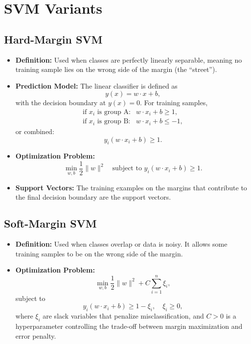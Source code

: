 \documentclass[10pt]{article}
\begin{document}
\section{SVM Variants}

\subsection{Hard-Margin SVM}
\begin{itemize}
    \item \textbf{Definition:} Used when classes are perfectly linearly separable, meaning no training sample lies on the wrong side of the margin (the “street”).
    \item \textbf{Prediction Model:} The linear classifier is defined as
    \[
    y(x) = w \cdot x + b,
    \]
    with the decision boundary at \(y(x)=0\). For training samples,
    \[
    \begin{array}{ll}
    \text{if } x_i \text{ is group A:} & w \cdot x_i + b \geq 1, \\
    \text{if } x_i \text{ is group B:} & w \cdot x_i + b \leq -1,
    \end{array}
    \]
    or combined:
    \[
    y_i (w \cdot x_i + b) \geq 1.
    \]
    \item \textbf{Optimization Problem:}
    \[
    \min_{w,b} \frac{1}{2}\|w\|^2 \quad \text{subject to } y_i (w \cdot x_i + b) \geq 1.
    \]
    \item \textbf{Support Vectors:} The training examples on the margins that contribute to the final decision boundary are the support vectors.
\end{itemize}

\subsection{Soft-Margin SVM}
\begin{itemize}
    \item \textbf{Definition:} Used when classes overlap or data is noisy. It allows some training samples to be on the wrong side of the margin.
    \item \textbf{Optimization Problem:}
    \[
    \min_{w,b} \frac{1}{2}\|w\|^2 + C \sum_{i=1}^{n} \xi_i,
    \]
    subject to
    \[
    y_i (w \cdot x_i + b) \geq 1 - \xi_i, \quad \xi_i \geq 0,
    \]
    where \(\xi_i\) are slack variables that penalize misclassification, and \(C>0\) is a hyperparameter controlling the trade-off between margin maximization and error penalty.
\end{itemize}
\end{document}

